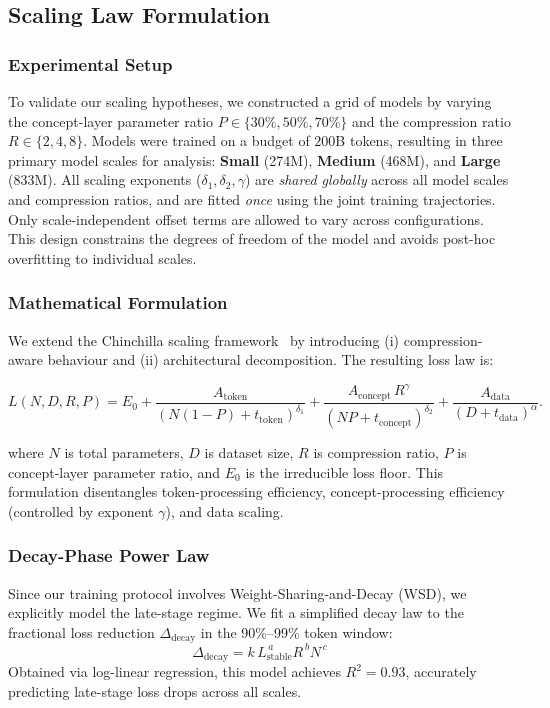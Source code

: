 \subsection{Scaling Law Formulation}

\subsubsection{Experimental Setup}
To validate our scaling hypotheses, we constructed a grid of models by varying the concept-layer parameter ratio $P \in \{30\%, 50\%, 70\%\}$ and the compression ratio $R \in \{2, 4, 8\}$. Models were trained on a budget of $200$B tokens, resulting in three primary model scales for analysis: \textbf{Small} (274M), \textbf{Medium} (468M), and \textbf{Large} (833M). All scaling exponents ($\delta_1, \delta_2, \gamma$) are \emph{shared globally} across all model scales and compression ratios, and are fitted \emph{once} using the joint training trajectories.
Only scale-independent offset terms are allowed to vary across configurations.
This design constrains the degrees of freedom of the model and avoids post-hoc overfitting to individual scales.


\subsubsection{Mathematical Formulation}
We extend the Chinchilla scaling framework~\cite{hoffmann2022training} by introducing (i) compression-aware behaviour and (ii) architectural decomposition. The resulting loss law is:

\begin{equation}
\label{eq:scaling_law}
L(N, D, R, P) 
= E_0
+ \frac{A_{\text{token}}}
       {(N(1-P) + t_{\text{token}})^{\delta_1}}
+ \frac{A_{\text{concept}} \, R^{\gamma}}
       {(NP + t_{\text{concept}})^{\delta_2}}
+ \frac{A_{\text{data}}}
       {(D + t_{\text{data}})^{\alpha}}.
\end{equation}

where $N$ is total parameters, $D$ is dataset size, $R$ is compression ratio, $P$ is concept-layer parameter ratio, and $E_0$ is the irreducible loss floor. This formulation disentangles token-processing efficiency, concept-processing efficiency (controlled by exponent $\gamma$), and data scaling.

\subsubsection{Decay-Phase Power Law}
Since our training protocol involves Weight-Sharing-and-Decay (WSD), we explicitly model the late-stage regime. We fit a simplified decay law to the fractional loss reduction $\Delta_{\text{decay}}$ in the 90\%–99\% token window:
\begin{equation}
\Delta_{\text{decay}} = k \, L_{\text{stable}}^{\,a} R^{\,b} N^{\,c}
\end{equation}
Obtained via log-linear regression, this model achieves $R^2 = 0.93$, accurately predicting late-stage loss drops across all scales.

